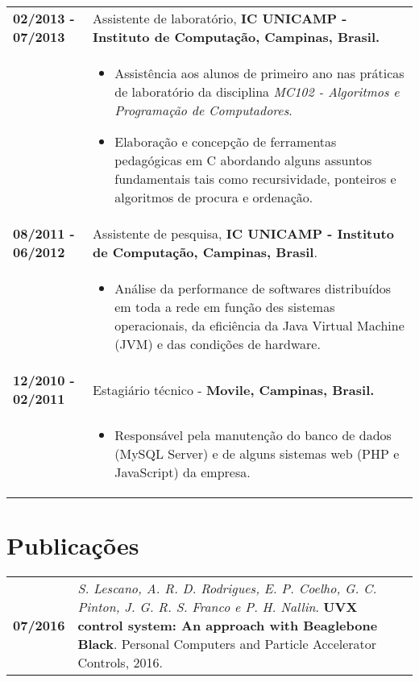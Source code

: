 \documentclass[10pt, a4paper]{article}
\begin{document}
\begin{tabular}{p{} p{}}
\textbf{02/2013 - 07/2013}   & Assistente de laboratório, \textbf{IC
UNICAMP - Instituto de Computação, Campinas, Brasil.} \\
& \vspace{-12pt}
\begin{itemize}
  \item Assistência aos alunos de primeiro ano nas práticas de laboratório da
  disciplina \textit{MC102 - Algoritmos e Programação de Computadores}.
  \vspace{-8pt}
  \item Elaboração e concepção de ferramentas pedagógicas em C
  abordando alguns assuntos fundamentais tais como recursividade, ponteiros e
  algoritmos de procura e ordenação.
\end{itemize}\\

\textbf{08/2011 - 06/2012} & Assistente de pesquisa, \textbf{IC UNICAMP -
Instituto de Computação, Campinas, Brasil}. \\
& \vspace{-12pt}
\begin{itemize}
  \item Análise da performance de softwares distribuídos em toda a rede em
  função des sistemas operacionais, da eficiência da Java Virtual Machine (JVM)
  e das condições de hardware.
\end{itemize}
\\


\textbf{12/2010 - 02/2011} & Estagiário técnico - \textbf{Movile,
Campinas, Brasil.}
\\  &  \vspace{-12pt}
\begin{itemize} 
\item Responsável pela manutenção do banco de dados (MySQL Server) e de
alguns sistemas web (PHP e JavaScript) da empresa.
\end{itemize}
\end{tabular}
\vspace{-12pt}


\section{Publicações}

\begin{tabular}{p{} p{}}

\textbf{07/2016}  & \textit{S. Lescano, A. R. D. Rodrigues, E. P.
Coelho, G. C. Pinton, J. G. R. S. Franco e P. H. Nallin}. \textbf{UVX
control system: An approach with Beaglebone Black}. Personal Computers and
Particle Accelerator Controls, 2016.
\\

\end{tabular}
\end{document}

